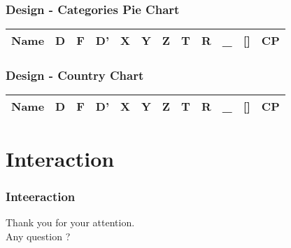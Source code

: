 \documentclass{beamer}
\begin{document}
\begin{frame}
\frametitle{Design - Categories Pie Chart}

\begin{table}
\centering
\begin{tabular}{|c|c|c|c||c|c|c|c|c|c|c||c|}
\hline
Name & D & F & D' & X & Y & Z & T & R & \_ & [] & CP\\
\hline
\end{tabular}
\end{table}

\end{frame}

\begin{frame}
\frametitle{Design - Country Chart}

\begin{table}
\centering
\begin{tabular}{|c|c|c|c||c|c|c|c|c|c|c||c|}
\hline
Name & D & F & D' & X & Y & Z & T & R & \_ & [] & CP\\
\hline
\end{tabular}
\end{table}

\end{frame}

\section{Interaction}

\begin{frame}
\frametitle{Inteeraction}
\end{frame}


\begin{frame}
Thank you for your attention.\\
Any question ?
\end{frame}
\end{document}
